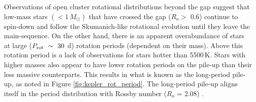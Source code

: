 %

Observations of open cluster rotational distributions beyond the gap suggest that low-mass stars $\left( < 1 \, M_{\odot}\right)$ that have crossed the gap ($R_o>\,\,$0.6) continue to spin-down and follow the Skumanich-like rotational evolution until they leave the main-sequence.
On the other hand, there is an apparent overabundance of stars at large ($P_{\rm{rot}} \ \sim \ 30$ d) rotation periods (dependent on their mass). 
Above this rotation period is a lack of observations for stars hotter than 5500$\,$K.
Stars with higher masses also appear to have lower rotation periods on the pile-up than their less massive counterparts.
This results in what is known as the long-period pile-up, as noted in Figure \ref{fig:kepler_rot_period}.
The long-period pile-up aligns itself in the \citet{mcquillan_rotation_2014} period distribution with Rossby number  ($R_o$ = 2.08) \citep{van_saders_forward_2019}.
 
